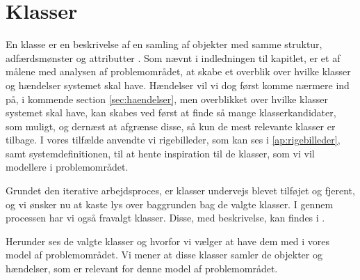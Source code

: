 \section{Klasser}
\label{sec:klasser}

En klasse er en beskrivelse af en samling af objekter med samme struktur, adfærdsmønster og attributter \cite[s. ~51]{ooad}. Som nævnt i indledningen til kapitlet, er et af målene med analysen af problemområdet, at skabe et overblik over hvilke klasser og hændelser systemet skal have. Hændelser vil vi dog først komme nærmere ind på, i kommende section \ref{sec:haendelser}, men overblikket over hvilke klasser systemet skal have, kan skabes ved først at finde så mange klasserkandidater, som muligt, og dernæst at afgrænse disse, så kun de mest relevante klasser er tilbage. I vores tilfælde anvendte vi rigebilleder, som kan ses i \ref{ap:rigebilleder}, samt systemdefinitionen, til at hente inspiration til de klasser, som vi vil modellere i problemområdet.

Grundet den iterative arbejdsproces, er klasser undervejs blevet tilføjet og fjerent, og vi ønsker nu at kaste lys over baggrunden bag de valgte klasser. I gennem processen har vi også fravalgt klasser. Disse, med beskrivelse, kan findes i .

Herunder ses de valgte klasser og hvorfor vi vælger at have dem med i vores model af problemområdet.
Vi mener at disse klasser samler de objekter og hændelser, som er relevant for denne model af problemområdet.

